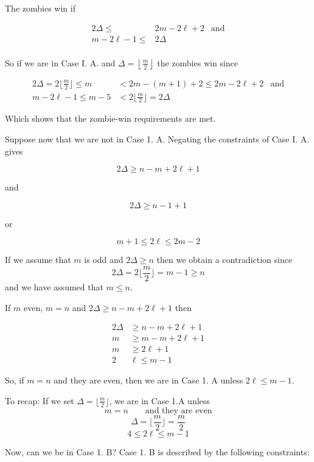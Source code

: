 The zombies win if

\begin{align*}
 2 \Delta \leq      & 2 m- 2 \ell + 2 & \text{and} \\
 m - 2\ell  -1 \leq & 2 \Delta                     \\
\end{align*}

So if we are in Case I. A. and $\Delta = \left\lfloor \frac{m}{2} \right\rfloor$ the zombies win since

\begin{align*}
  2 \Delta = 2 \lfloor \frac{m}{2} \rfloor \leq m &< 2m - (m+1) + 2\leq 2 m- 2 \ell + 2 & \text{and}\\
  m - 2\ell -1 \leq m - 5 &< 2 \lfloor \frac{m}{2} \rfloor = 2 \Delta
\end{align*}

Which shows that the zombie-win requirements are met.

Suppose now that we are not in Case 1. A. Negating the constraints of Case I. A. gives

\[ 2\Delta \geq n - m + 2\ell +1 \]
\begin{center}and\end{center}
\[ 2 \Delta \geq n - 1 + 1 \]
\begin{center}or\end{center}
\[ m+1 \leq 2 \ell \leq 2m -2 \]

If we assume that $m$ is odd and $ 2 \Delta \geq n$ then we obtain a
contradiction since
\[ 2 \Delta = 2 \lfloor \frac{m}{2} \rfloor = m -1 \geq n \]
and we have assumed that $m \leq n$.

If $m$ even, $m = n$ and $2\Delta \geq n - m + 2\ell +1$ then

\begin{align*}
  2 \Delta & \geq n - m + 2\ell + 1 \\
  m & \geq m - m + 2 \ell + 1 \\
  m & \geq 2 \ell + 1 \\
  2 & \ell \leq m -1
\end{align*}

So, if $m = n$ and they are even, then we are in Case 1. A unless $2 \ell \leq m -1$.

To recap: If we set $\Delta = \lfloor \frac{m}{2} \rfloor$, we are in Case 1.A unless
\[ m = n \qquad \text{and they are even} \]
\[ \Delta = \lfloor \frac{m}{2} \rfloor = \frac{m}{2} \]
\[ 4 \leq 2 \ell \leq m -1 \]

Now, can we be in Case 1. B? Case 1. B is described by the following constraints:

